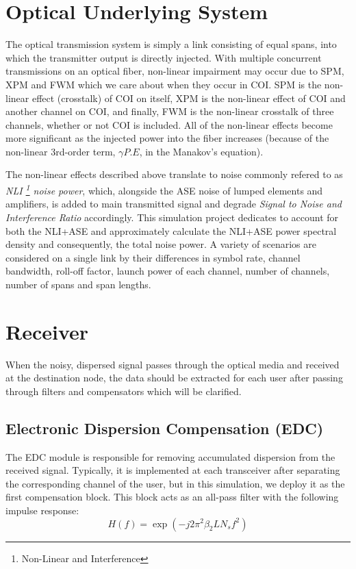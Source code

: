 \documentclass[10pt,letterpaper]{article}
\begin{document}
\section{Optical Underlying System}
The optical transmission system is simply a link consisting of equal spans, into which the transmitter output is directly injected. With multiple concurrent transmissions on an optical fiber, non-linear impairment may occur due to SPM, XPM and FWM which we care about when they occur in COI. SPM is the non-linear effect (crosstalk) of COI on itself, XPM is the non-linear effect of COI and another channel on COI, and finally, FWM is the non-linear crosstalk of three channels, whether or not COI is included. All of the non-linear effects become more significant as the injected power into the fiber increases (because of the non-linear 3rd-order term, $\gamma P.E$, in the Manakov's equation).

The non-linear effects described above translate to noise commonly refered to as \textit{NLI
\footnote{
Non-Linear and Interference
}
 noise power}, which, alongside the ASE noise of lumped elements and amplifiers, is added to main transmitted signal and degrade \textit{Signal to Noise and Interference Ratio} accordingly. This simulation project dedicates to account for both the NLI+ASE and approximately calculate the NLI+ASE power spectral density and consequently, the total noise power. A variety of scenarios are considered on a single link by their differences in symbol rate, channel bandwidth, roll-off factor, launch power of each channel, number of channels, number of spans and span lengths.
\section{Receiver}
When the noisy, dispersed signal passes through the optical media and received at the destination node, the data should be extracted for each user after passing through filters and compensators which will be clarified.
\subsection{Electronic Dispersion Compensation (EDC)}
The EDC module is responsible for removing accumulated dispersion from the received signal. Typically, it is implemented at each transceiver after separating the corresponding channel of the user, but in this simulation, we deploy it as the first compensation block. This block acts as an all-pass filter with the following impulse response:
$$
H(f)=\exp(-j2\pi^2\beta_2LN_sf^2)
$$
\end{document}
